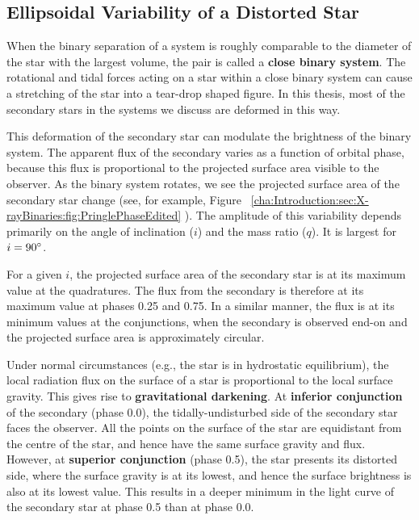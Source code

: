 
\subsection{Ellipsoidal Variability of a Distorted Star}\label{cha:Introduction:sec:X-rayBinaries:subsec:EllipsoidalVariability}

When the binary separation of a system is roughly comparable to the
diameter of the star with the largest volume, the pair is called a
\textbf{close binary system}. %
The rotational and tidal forces acting on a star within a close binary
system can cause a stretching of the star into a tear-drop shaped
figure. In this thesis, most of the secondary stars in the systems we discuss are deformed in this way. %

\vspace{\myparskip}

This deformation of the secondary star can modulate the brightness of the binary system. %
The apparent flux of the secondary varies as a function of orbital phase, because this flux is
proportional to the projected surface area %
visible to the observer. As the binary system rotates, we see the projected surface area of the secondary star change (see, for example, Figure~%
\vref{cha:Introduction:sec:X-rayBinaries:fig:PringlePhaseEdited}%
). The amplitude of this variability depends primarily on the angle of inclination ($i$) and the mass ratio ($q$). It is largest for $i=90\hbox{$^\circ$}$. %

\vspace{\myparskip}

For a given $i$, the projected surface area of the secondary star is
at its maximum value at the quadratures. The flux from the secondary is therefore at
its maximum value at phases 0.25 and 0.75. In a similar manner, the
flux is at its minimum values at the conjunctions, when the secondary is observed end-on and the
projected surface area is approximately circular. %

\vspace{\myparskip}

Under normal circumstances (e.g., the star is in hydrostatic
equilibrium), the local radiation flux on the surface of a star is
proportional to the local surface gravity. %
This gives rise to \textbf{gravitational darkening}. %
At \textbf{inferior conjunction} of the secondary (phase 0.0), the tidally-undisturbed side of the
secondary star faces the observer. All the points on the surface of
the star are equidistant from the centre of the star, and hence have the
same surface gravity and flux. %
However, at \textbf{superior conjunction} (phase 0.5), the star presents its distorted side, where the surface gravity is at its lowest, and hence the surface brightness
is also at its lowest value. This results in a deeper minimum in the light curve of the secondary star at phase 0.5 than at phase 0.0.

